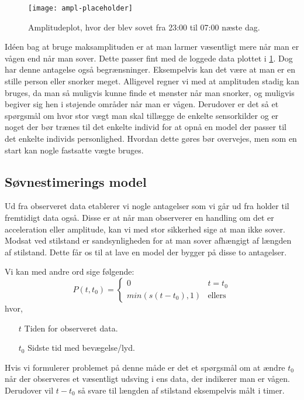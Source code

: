 \begin{figure}[h]
	\centering
	\texttt{[image: ampl-placeholder]}
	\caption{Amplitudeplot, hvor der blev sovet fra 23:00 til 07:00 næste dag.}\label{fig:amplplot}
\end{figure}

Idéen bag at bruge maksamplituden er at man larmer væsentligt mere når man er vågen end når man sover.
Dette passer fint med de loggede data plottet i \cref{fig:amplplot}.
Dog har denne antagelse også begrænsninger.
Eksempelvis kan det være at man er en stille person eller snorker meget.
Alligevel regner vi med at amplituden stadig kan bruges, da man så muligvis kunne finde et mønster når man snorker, og muligvis begiver sig hen i støjende områder når man er vågen. Derudover er det så et spørgsmål om hvor stor vægt man skal tillægge de enkelte sensorkilder og er noget der bør trænes til det enkelte individ for at opnå en model der passer til det enkelte individs personlighed.
Hvordan dette gøres bør overvejes, men som en start kan nogle fastsatte vægte bruges.

\subsection{Søvnestimerings model}
Ud fra observeret data etablerer vi nogle antagelser som vi går ud fra holder til fremtidigt data også.
Disse er at når man observerer en handling om det er acceleration eller amplitude, kan vi med stor sikkerhed sige at man ikke sover.
Modsat ved stilstand er sandsynligheden for at man sover afhængigt af længden af stilstand.
Dette får os til at lave en model der bygger på disse to antagelser.

Vi kan med andre ord sige følgende:
\begin{equation}
P(t,t_0) =
\begin{cases}
0	& t = t_0 \\
min(s(t-t_0),1) & \text{ellers}
\end{cases}
\end{equation}
hvor,
\begin{itemize}
	\item[$t$] Tiden for observeret data.
	\item[$t_0$] Sidste tid med bevægelse/lyd.
\end{itemize}
Hvis vi formulerer problemet på denne måde er det et spørgsmål om at ændre $t_0$ når der observeres et væsentligt udsving i ens data, der indikerer man er vågen.
Derudover vil $t-t_0$ så svare til længden af stilstand eksempelvis målt i timer.

